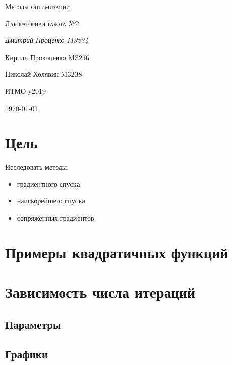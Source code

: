 \documentclass[russian, english]{article}
\begin{document}
\begin{titlepage}
\centering
	{\scshape\LARGE Методы оптимизации \par}
	\vspace{1cm}
	{\scshape\Large Лабораторная работа №2\par}
	\vspace{2cm}
	{\Large\itshape Дмитрий Проценко M3234 \par
	Кирилл Прокопенко M3236 \par
	Николай Холявин M3238 \par}
	\vfill
	ИТМО y2019
	\vfill
	{\large \today\par}
\end{titlepage}

\tableofcontents
\newpage

\section{Цель}
Исследовать методы:
\begin{itemize}
	\item градиентного спуска
	\item наискорейшего спуска
	\item сопряженных градиентов
\end{itemize}

\section{Примеры квадратичных функций}
\section{Зависимость числа итераций}
\subsection{Параметры}
\subsection{Графики}
\end{document}
